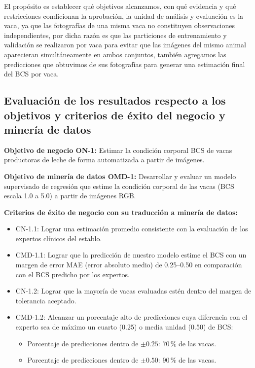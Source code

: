 El propósito es establecer qué objetivos alcanzamos, con qué evidencia y qué restricciones condicionan la aprobación, la unidad de análisis y evaluación es la vaca, ya que las fotografías de una misma vaca no constituyen observaciones independientes, por dicha razón es que las particiones de entrenamiento y validación se realizaron por vaca para evitar que las imágenes del mismo animal aparecieran simultáneamente en ambos conjuntos, también agregamos las predicciones que obtuvimos de sus fotografías para generar una estimación final del BCS por vaca.

\subsection{Evaluación de los resultados respecto a los objetivos y criterios de éxito del negocio y minería de datos}

\textbf{Objetivo de negocio ON-1:} Estimar la condición corporal BCS de vacas productoras de leche de forma automatizada a partir de imágenes.

\textbf{Objetivo de minería de datos OMD-1:} Desarrollar y evaluar un modelo supervisado de regresión que estime la condición corporal de las vacas (BCS escala 1.0 a 5.0) a partir de imágenes RGB.

\textbf{Criterios de éxito de negocio con su traducción a minería de datos:}

\begin{itemize}
  \item CN-1.1: Lograr una estimación promedio consistente con la evaluación de los expertos clínicos del establo.
  \item CMD-1.1: Lograr que la predicción de nuestro modelo estime el BCS con un margen de error MAE (error absoluto medio) de 0.25--0.50 en comparación con el BCS predicho por los expertos.
  \item CN-1.2: Lograr que la mayoría de vacas evaluadas estén dentro del margen de tolerancia aceptado.
  \item CMD-1.2: Alcanzar un porcentaje alto de predicciones cuya diferencia con el experto sea de máximo un cuarto (0.25) o media unidad (0.50) de BCS:
  \begin{itemize}
    \item Porcentaje de predicciones dentro de $\pm0.25$: 70\,\% de las vacas.
    \item Porcentaje de predicciones dentro de $\pm0.50$: 90\,\% de las vacas.
  \end{itemize}
\end{itemize}

